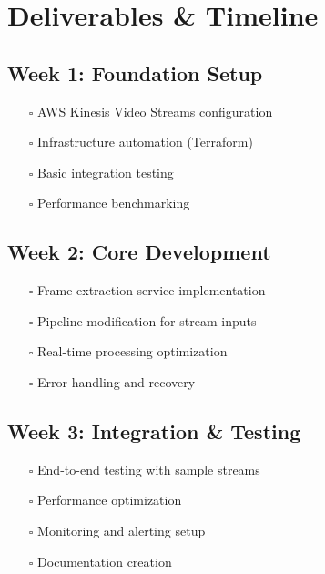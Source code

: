 \documentclass[11pt,a4paper]{article}
\begin{document}
\section{Deliverables \& Timeline}

\subsection{Week 1: Foundation Setup}
\begin{itemize}[leftmargin=1.5cm]
    \item[\textcolor{clannblue}{$\square$}] AWS Kinesis Video Streams configuration
    \item[\textcolor{clannblue}{$\square$}] Infrastructure automation (Terraform)
    \item[\textcolor{clannblue}{$\square$}] Basic integration testing
    \item[\textcolor{clannblue}{$\square$}] Performance benchmarking
\end{itemize}

\subsection{Week 2: Core Development}
\begin{itemize}[leftmargin=1.5cm]
    \item[\textcolor{clannblue}{$\square$}] Frame extraction service implementation
    \item[\textcolor{clannblue}{$\square$}] Pipeline modification for stream inputs
    \item[\textcolor{clannblue}{$\square$}] Real-time processing optimization
    \item[\textcolor{clannblue}{$\square$}] Error handling and recovery
\end{itemize}

\subsection{Week 3: Integration \& Testing}
\begin{itemize}[leftmargin=1.5cm]
    \item[\textcolor{clannblue}{$\square$}] End-to-end testing with sample streams
    \item[\textcolor{clannblue}{$\square$}] Performance optimization
    \item[\textcolor{clannblue}{$\square$}] Monitoring and alerting setup
    \item[\textcolor{clannblue}{$\square$}] Documentation creation
\end{itemize}
\end{document}
